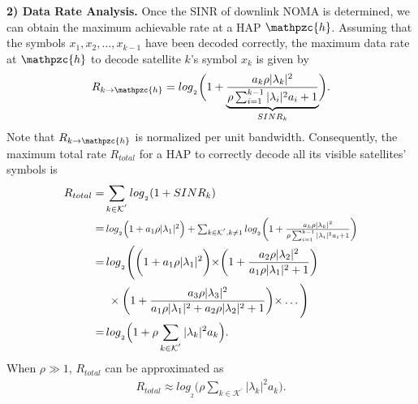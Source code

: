 \documentclass[letter,journal]{IEEEtran}
\newcommand*{\Resize}[2]{\resizebox{#1}{!}{$#2$}}%
\begin{document}
{\bf 2) Data Rate Analysis.}
Once the SINR of downlink NOMA is determined, we can obtain the maximum achievable rate at a HAP $\mathpzc{h}$. Assuming that the symbols $x_1, x_2,\dots, x_{k-1}$ have been decoded correctly, the maximum data rate at $\mathpzc{h}$ to decode satellite $k$'s symbol $x_k$ is given by
\begin{equation}
    R_{k\rightarrow \mathpzc{h}}={log}_ {_2}\biggl(1+ \underbrace{\frac{a_k \rho |\lambda_{k}|^2}{\rho \sum_{i=1}^{k-1} |\lambda_i|^2a_i+1}}_{SINR_{k}}\biggl).
\end{equation}
Note that $R_{k\rightarrow \mathpzc{h}}$ is normalized per unit bandwidth. Consequently, the maximum total rate $R_{total}$ for a HAP to correctly decode all its visible satellites' symbols is %
\begin{align}
      R_{total} =& \sum_{k\in \mathcal K^{'}} {log}_ {_2} (1+SINR_k)\notag\\
      =&\,\Resize{7.8cm}{ {log}_ {_2}\Big(1+ a_1 \rho |\lambda_1|^2\Big) + \sum_{k\in \mathcal K^{'},k\neq 1} {log}_ {_2} \biggl(1+ \frac{a_k \rho |\lambda_{k}|^2}{\rho \sum_{i=1}^{k-1} |\lambda_i|^2 a_i + 1}\biggl)}\notag\\
      =&\, {{log}_ {_2}\Biggl(\biggl(1+ a_1 \rho |\lambda_1|^2\biggl) \times \biggl(1+ \frac{a_2 \rho |\lambda_{2}|^2}{a_1\rho |\lambda_1|^2  + 1}\biggl)}\notag\\
      &\ \times \biggl(1+ \frac{a_3 \rho |\lambda_{3}|^2}{a_1\rho |\lambda_1|^2 +a_2\rho |\lambda_2|^2 + 1}\biggl) \times \dots\Biggl)\notag\\
      =&\, {log}_ {_2}\Big(1+ \rho \sum_{k\in \mathcal K^{'}} |\lambda_{k}|^2 a_k\Big).
\end{align}
When $\rho \gg 1$, $R_{total}$ can be approximated as\vspace{-0.1cm}
\begin{align}
      R_{total}\approx log_ {_2} \Big(\rho \sum_{k\in\mathcal K^{'}}|\lambda_{k}|^2a_k\Big).
\end{align}
\end{document}
